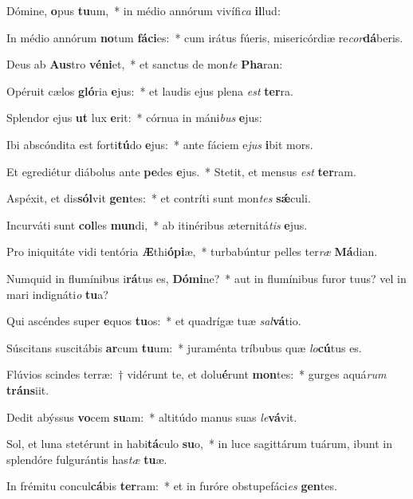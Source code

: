 \item Dómine, \textbf{o}pus \textbf{tu}um,~* in médio annórum vivífi\textit{ca} \textbf{il}lud:
\item In médio annórum \textbf{no}tum \textbf{fá}\textbf{ci}es:~* cum irátus fúeris, misericórdiæ re\textit{cor}\textbf{dá}beris.
\item Deus ab \textbf{Aus}tro \textbf{vé}\textbf{ni}et,~* et sanctus de mon\textit{te} \textbf{Pha}ran:
\item Opéruit cælos \textbf{gló}ria \textbf{e}jus:~* et laudis ejus plena \textit{est} \textbf{ter}ra.
\item Splendor ejus \textbf{ut} lux \textbf{e}rit:~* córnua in máni\textit{bus} \textbf{e}jus:
\item Ibi abscóndita est forti\textbf{tú}do \textbf{e}jus:~* ante fáciem e\textit{jus} \textbf{i}bit mors.
\item Et egrediétur diábolus ante \textbf{pe}des \textbf{e}jus.~* Stetit, et mensus \textit{est} \textbf{ter}ram.
\item Aspéxit, et dis\textbf{sól}vit \textbf{gen}tes:~* et contríti sunt mon\textit{tes} \textbf{sǽ}culi.
\item Incurváti sunt \textbf{col}les \textbf{mun}di,~* ab itinéribus æternitá\textit{tis} \textbf{e}jus.
\item Pro iniquitáte vidi tentória \textbf{Æ}thi\textbf{ó}\textbf{pi}æ,~* turbabúntur pelles ter\textit{ræ} \textbf{Má}dian.
\item Numquid in flumínibus i\textbf{rá}tus es, \textbf{Dó}\textbf{mi}ne?~* aut in flumínibus furor tuus? vel in mari indignáti\textit{o} \textbf{tu}a?
\item Qui ascéndes super \textbf{e}quos \textbf{tu}os:~* et quadrígæ tuæ \textit{sal}\textbf{vá}tio.
\item Súscitans suscitábis \textbf{ar}cum \textbf{tu}um:~* juraménta tríbubus quæ \textit{lo}\textbf{cú}tus es.
\item Flúvios scindes terræ:~† vidérunt te, et dolu\textbf{é}runt \textbf{mon}tes:~* gurges aquá\textit{rum} \textbf{tráns}iit.
\item Dedit abýssus \textbf{vo}cem \textbf{su}am:~* altitúdo manus suas \textit{le}\textbf{vá}vit.
\item Sol, et luna stetérunt in habi\textbf{tá}culo \textbf{su}o,~* in luce sagittárum tuárum, ibunt in splendóre fulgurántis has\textit{tæ} \textbf{tu}æ.
\item In frémitu concul\textbf{cá}bis \textbf{ter}ram:~* et in furóre obstupefáci\textit{es} \textbf{gen}tes.
